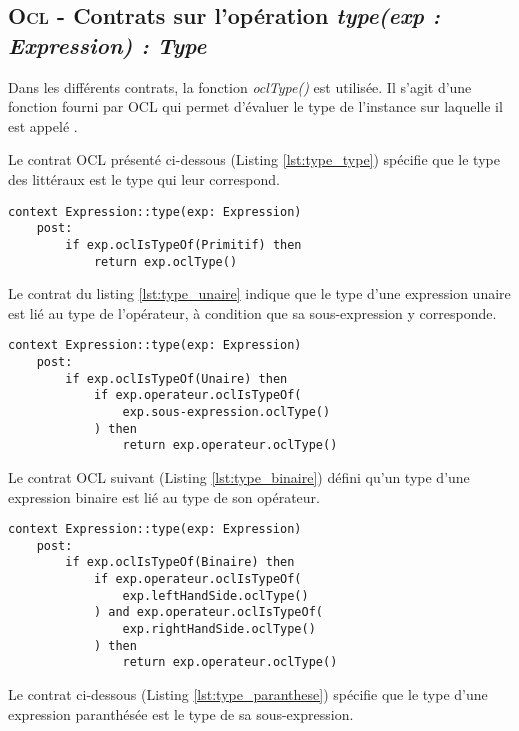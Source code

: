 
\subsection{\textsc{Ocl} - Contrats sur l'opération \emph{type(exp : Expression) : Type}}
\label{sec:question13}

Dans les différents contrats, la fonction \emph{oclType()} est utilisée. Il s'agit d'une fonction fourni par OCL qui permet d'évaluer le type de l'instance sur laquelle il est appelé \citep{Omg2012}.

Le contrat OCL présenté ci-dessous (Listing \ref{lst:type_type}) spécifie que le type des littéraux est le type qui leur correspond.

\begin{lstlisting}[caption=Le type des littéraux est le type qui leur correspond,captionpos=b,label={lst:type_type},language=OCL]
context Expression::type(exp: Expression)
	post:
		if exp.oclIsTypeOf(Primitif) then
			return exp.oclType()
\end{lstlisting}

Le contrat du listing \ref{lst:type_unaire} indique que le type d'une expression unaire est lié au type de l'opérateur, à condition que sa sous-expression y corresponde.

\begin{lstlisting}[caption=Contrat OCL sur le type unaire,captionpos=b,label={lst:type_unaire},language=OCL]
context Expression::type(exp: Expression)
	post:
		if exp.oclIsTypeOf(Unaire) then
			if exp.operateur.oclIsTypeOf(
				exp.sous-expression.oclType()
			) then
				return exp.operateur.oclType()
\end{lstlisting}

Le contrat OCL suivant (Listing \ref{lst:type_binaire}) défini qu'un type d'une expression binaire est lié au type de son opérateur.

\begin{lstlisting}[caption=Contrat OCL sur le type binaire,captionpos=b,label={lst:type_binaire},language=OCL]
context Expression::type(exp: Expression)
	post:
		if exp.oclIsTypeOf(Binaire) then
			if exp.operateur.oclIsTypeOf(
				exp.leftHandSide.oclType()
			) and exp.operateur.oclIsTypeOf(
				exp.rightHandSide.oclType()
			) then
				return exp.operateur.oclType()
\end{lstlisting}

Le contrat ci-dessous (Listing \ref{lst:type_paranthese}) spécifie que le type d'une expression paranthésée est le type de sa sous-expression.

